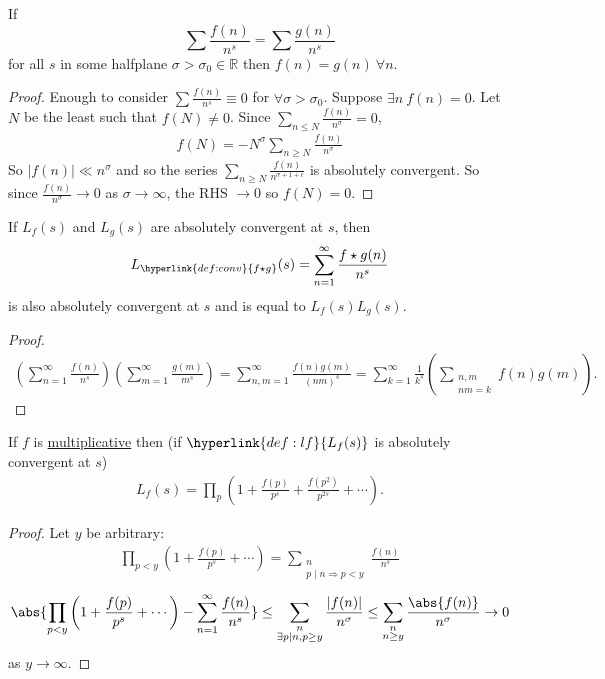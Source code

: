 \documentclass{article}
\newcommand{\1}{\mathbbm{1}}
\begin{document}
\begin{nlemma}
  If
  \begin{equation*}
  \sum \frac{f(n)}{n^s} = \sum \frac{g(n)}{n^s}
  \end{equation*}
  for all $s$ in some halfplane $\sigma > \sigma_0 \in \mathbb{R}$ then $f(n) = g(n)\ \forall n$.
\end{nlemma}
\begin{proof}
  Enough to consider $\sum \frac{f(n)}{n^s} \equiv 0$ for $\forall \sigma > \sigma_0$.
  Suppose $\exists n\ f(n) = 0$. Let $N$ be the least such that $f(N) \neq 0$.
  Since $\sum_{n \leq N} \frac{f(n)}{n^\sigma} = 0$,
  \begin{align*}
    f(N) = -N^\sigma \sum_{n \geq N} \frac{f(n)}{n^\sigma}
  \end{align*}
  So $|f(n)| \ll n^\sigma$ and so the series $\sum_{n \geq N} \frac{f(n)}{n^{\sigma+1+\epsilon}}$ is absolutely convergent.
  So since $\frac{f(n)}{n^\sigma} \to 0$ as $\sigma \to \infty$, the RHS $\to 0$ so $f(N) = 0$.
\end{proof}
\begin{nlemma}
  If \hyperlink{def:lf}{$L_f(s)$} and $L_g(s)$ are absolutely convergent at $s$, then
  \begin{align*}
    L_{\hyperlink{def:conv}{f \star g}}(s) = \sum_{n =1}^\infty \frac{f \star g(n)}{n^s}
  \end{align*}
  is also absolutely convergent at $s$ and is equal to $L_f(s) L_g(s)$.
\end{nlemma}
\begin{proof}
  \begin{align*}
    \left(\sum_{n=1}^\infty \frac{f(n)}{n^s}\right)\left(\sum_{m=1}^\infty \frac{g(m)}{m^s}\right) = \sum_{n,m=1}^\infty \frac{f(n)g(m)}{(nm)^s} = \sum_{k=1}^\infty \frac{1}{k^s} \left(\sum_{\substack{n,m\\ nm=k}} f(n) g(m)\right).
  \end{align*}
\end{proof}
\begin{nlemma}
  If $f$ is \hyperlink{def:multi}{multiplicative} then (if $\hyperlink{def:lf}{L_f(s)}$ is absolutely convergent at $s$)
  \begin{align*}
    L_f(s) = \prod_p \left(1 + \frac{f(p)}{p^s} + \frac{f(p^2)}{p^{2s}} + \dotsb\right).
  \end{align*}
\end{nlemma}
\begin{proof}
  Let $y$ be arbitrary:
  \begin{align*}
    \prod_{p < y} \left(1 + \frac{f(p)}{p^s} + \dotsb\right) = \sum_{\substack{n \\ p \mid n \Rightarrow p < y}} \frac{f(n)}{n^s}
  \end{align*}
  \begin{align*}
    \abs{\prod_{p < y} \left(1 + \frac{f(p)}{p^s} + \dotsb\right) - \sum_{n=1}^\infty \frac{f(n)}{n^s}} \leq \sum_{\substack{n \\ \exists p \mid n, p \geq y}} \frac{|f(n)|}{n^\sigma} \leq \sum_{\substack{n \\ n \geq y}} \frac{\abs{f(n)}}{n^\sigma} \to 0
  \end{align*}
  as $y \to \infty$.
\end{proof}
\end{document}
